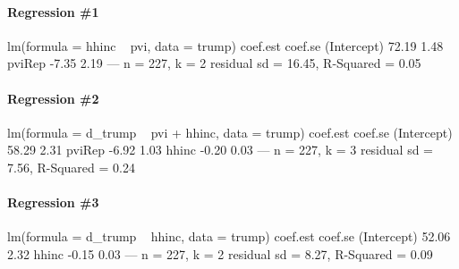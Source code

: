 \documentclass[addpoints,12pt]{exam}
\begin{document}
\begin{questions}

\newpage
\footnotesize
\paragraph{\footnotesize Regression \#1}
\begin{boxedverbatim}
lm(formula = hhinc ~ pvi, data = trump)
            coef.est coef.se
(Intercept) 72.19     1.48  
pviRep      -7.35     2.19  
---
n = 227, k = 2
residual sd = 16.45, R-Squared = 0.05
\end{boxedverbatim}
\vspace{-1em}

\paragraph{\footnotesize Regression \#2}
\begin{boxedverbatim}
lm(formula = d_trump ~ pvi + hhinc, data = trump)
            coef.est coef.se
(Intercept) 58.29     2.31  
pviRep      -6.92     1.03  
hhinc       -0.20     0.03  
---
n = 227, k = 3
residual sd = 7.56, R-Squared = 0.24
\end{boxedverbatim}
\vspace{-1em}

\paragraph{\footnotesize Regression \#3}
\begin{boxedverbatim}
lm(formula = d_trump ~ hhinc, data = trump)
            coef.est coef.se
(Intercept) 52.06     2.32  
hhinc       -0.15     0.03  
---
n = 227, k = 2
residual sd = 8.27, R-Squared = 0.09
\end{boxedverbatim}
\vspace{-1em}


\end{questions}
\end{document}
